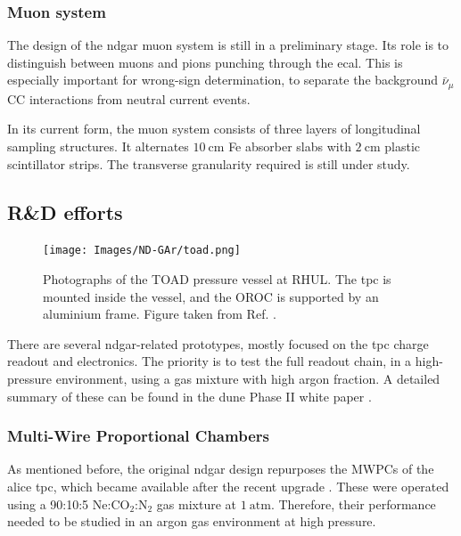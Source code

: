 \subsubsection{Muon system}

The design of the \gls{ndgar} muon system is still in a preliminary stage. Its role is to distinguish between muons and pions punching through the \gls{ecal}. This is especially important for wrong-sign determination, to separate the background $\bar{\nu}_{\mu}$ CC interactions from neutral current events.

In its current form, the muon system consists of three layers of longitudinal sampling structures. It alternates $10~\mathrm{cm}$ Fe absorber slabs with $2~\mathrm{cm}$ plastic scintillator strips. The transverse granularity required is still under study.

\subsection{R\&D efforts}

\begin{figure}[t]
	\centering
	\texttt{[image: Images/ND-GAr/toad.png]}
	\caption[Photographs of the TOAD pressure vessel at RHUL.]{Photographs of the TOAD pressure vessel at RHUL. The \gls{tpc} is mounted inside the vessel, and the OROC is supported by an aluminium frame. Figure taken from Ref. \cite{Ritchie-Yates2023}.}
	\label{fig:toad}
\end{figure}

There are several \gls{ndgar}-related prototypes, mostly focused on the \gls{tpc} charge readout and electronics. The priority is to test the full readout chain, in a high-pressure environment, using a gas mixture with high argon fraction. A detailed summary of these can be found in the \gls{dune} Phase II white paper \cite{DUNE2024Phase2}.

\subsubsection{Multi-Wire Proportional Chambers}

As mentioned before, the original \gls{ndgar} design repurposes the MWPCs of the \gls{alice} \gls{tpc}, which became available after the recent upgrade \cite{ALICETPC2020}. These were operated using a 90:10:5 $\mathrm{Ne}$:$\mathrm{CO}_{2}$:$\mathrm{N}_{2}$ gas mixture at $1~\mathrm{atm}$. Therefore, their performance needed to be studied in an argon gas environment at high pressure.

